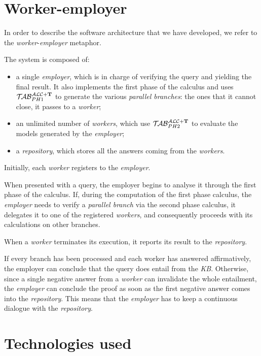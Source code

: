 \documentclass[a4paper, 11pt, oneside]{duthesis}
\newcommand{\tip}{{\bf T}}
\newcommand{\primo}{\mathrel{{\mathcal{T}\!\mathcal{AB}}}_{PH 1}^{\mathcal{ALC}+\mbox{\scriptsize $\tip$}}}
\newcommand{\secondo}{\mathrel{{\mathcal{T}\!\mathcal{AB}}}_{PH 2}^{\mathcal{ALC}+\mbox{\scriptsize $\tip$}}}
\begin{document}
\section{Worker-employer}\label{workemp}

In order to describe the software architecture that we have developed, we refer to the \emph{worker}-\emph{employer} metaphor.

The system is composed of:
\begin{itemize}
\item a single \emph{employer}, which is in charge of verifying the query and yielding the final result. It also implements the first phase of the calculus and uses $\primo$ to generate the various \emph{parallel branches}: the ones that it cannot close, it passes to a \emph{worker};
\item an unlimited number of \emph{workers}, which use $\secondo$ to evaluate the models generated by the \emph{employer};
\item a \emph{repository}, which stores all the answers coming from the \emph{workers}.
\end{itemize}
Initially, each \emph{worker} registers to the \emph{employer}.

When presented with a query, the employer begins to analyse it through the first phase of the calculus.
If, during the computation of the first phase calculus, the \emph{employer} needs to verify a \emph{parallel branch} via the second phase calculus, it delegates it to one of the registered \emph{workers}, and consequently proceeds with its calculations on other branches.

When a \emph{worker} terminates its execution, it reports its result to the \emph{repository}.

If every branch has been processed and each worker has answered affirmatively, the employer can conclude that the query does entail from the \emph{KB}.
Otherwise, since a single negative answer from a \emph{worker} can invalidate the whole entailment, the \emph{employer} can conclude the proof as soon as the first negative answer comes into the \emph{repository}.
This means that the \emph{employer} has to keep a continuous dialogue with the \emph{repository}.

\newpage

\section{Technologies used}\label{tech}
\end{document}
